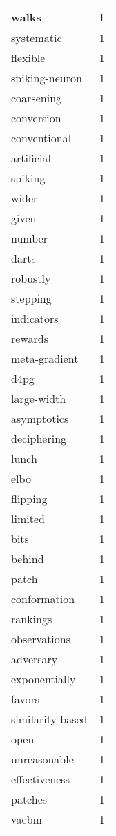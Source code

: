 \begin{table}[h]
\begin{tabular}{|l|r|}
\hline
walks & 1 \\
\hline
systematic & 1 \\
\hline
flexible & 1 \\
\hline
spiking-neuron & 1 \\
\hline
coarsening & 1 \\
\hline
conversion & 1 \\
\hline
conventional & 1 \\
\hline
artificial & 1 \\
\hline
spiking & 1 \\
\hline
wider & 1 \\
\hline
given & 1 \\
\hline
number & 1 \\
\hline
darts & 1 \\
\hline
robustly & 1 \\
\hline
stepping & 1 \\
\hline
indicators & 1 \\
\hline
rewards & 1 \\
\hline
meta-gradient & 1 \\
\hline
d4pg & 1 \\
\hline
large-width & 1 \\
\hline
asymptotics & 1 \\
\hline
deciphering & 1 \\
\hline
lunch & 1 \\
\hline
elbo & 1 \\
\hline
flipping & 1 \\
\hline
limited & 1 \\
\hline
bits & 1 \\
\hline
behind & 1 \\
\hline
patch & 1 \\
\hline
conformation & 1 \\
\hline
rankings & 1 \\
\hline
observations & 1 \\
\hline
adversary & 1 \\
\hline
exponentially & 1 \\
\hline
favors & 1 \\
\hline
similarity-based & 1 \\
\hline
open & 1 \\
\hline
unreasonable & 1 \\
\hline
effectiveness & 1 \\
\hline
patches & 1 \\
\hline
vaebm & 1 \\

\end{tabular}
\end{table}
